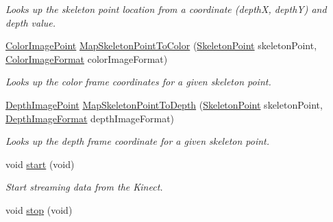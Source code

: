 \begin{DoxyCompactItemize}
\begin{DoxyCompactList}\small\item\em \-Looks up the skeleton point location from a coordinate (depth\-X, depth\-Y) and depth value. \end{DoxyCompactList}\item 
\hyperlink{class_color_image_point}{\-Color\-Image\-Point} \hyperlink{class_kinect_sensor_ad3868523f6623b18ac41aa1425dc4f0c}{\-Map\-Skeleton\-Point\-To\-Color} (\hyperlink{class_skeleton_point}{\-Skeleton\-Point} skeleton\-Point, \hyperlink{color_image_format_8h_a77f719572c3c368859dd2ec3153d8452}{\-Color\-Image\-Format} color\-Image\-Format)
\begin{DoxyCompactList}\small\item\em \-Looks up the color frame coordinates for a given skeleton point. \end{DoxyCompactList}\item 
\hyperlink{class_depth_image_point}{\-Depth\-Image\-Point} \hyperlink{class_kinect_sensor_a9c1e191b28ea57939654a73601b6f1bc}{\-Map\-Skeleton\-Point\-To\-Depth} (\hyperlink{class_skeleton_point}{\-Skeleton\-Point} skeleton\-Point, \hyperlink{depth_image_format_8h_a00bd0eac7784357ebca4c1e6a50b51af}{\-Depth\-Image\-Format} depth\-Image\-Format)
\begin{DoxyCompactList}\small\item\em \-Looks up the depth frame coordinate for a given skeleton point. \end{DoxyCompactList}\item 
\hypertarget{class_kinect_sensor_a2b527155e1db8222519d82983b652e28}{void \hyperlink{class_kinect_sensor_a2b527155e1db8222519d82983b652e28}{start} (void)}\label{class_kinect_sensor_a2b527155e1db8222519d82983b652e28}

\begin{DoxyCompactList}\small\item\em \-Start streaming data from the \-Kinect. \end{DoxyCompactList}\item 
\hypertarget{class_kinect_sensor_a70f2b2e2ef5f109f59428a41fad4b584}{void \hyperlink{class_kinect_sensor_a70f2b2e2ef5f109f59428a41fad4b584}{stop} (void)}\label{class_kinect_sensor_a70f2b2e2ef5f109f59428a41fad4b584}


\end{DoxyCompactItemize}
